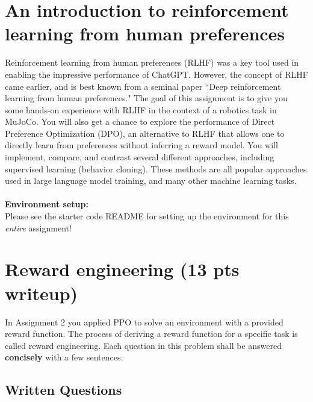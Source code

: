 \documentclass{article}
\begin{document}
\section*{An introduction to reinforcement learning from human preferences}

Reinforcement learning from human preferences (RLHF) was a key tool used in enabling the impressive performance of ChatGPT. However, the concept of RLHF came earlier, and is best known from a seminal paper ``Deep reinforcement learning from human preferences." The goal of this assignment is to give you some hands-on experience with RLHF in the context of a robotics task in MuJoCo. You will also get a chance to explore the performance of Direct Preference Optimization (DPO), an alternative to RLHF that allows one to directly learn from preferences without inferring a reward model.  
You will implement, compare, and contrast several different approaches, including supervised learning (behavior cloning). These methods are all popular approaches used in large language model training, and many other machine learning tasks.
\\
\\
\textbf{Environment setup:}\\
Please see the starter code README for setting up the environment for this \textit{entire} assignment!

\section{Reward engineering (13 pts writeup)}

In Assignment 2 you applied PPO to solve an environment with a provided reward function. The process of deriving a reward function for a specific task is called reward engineering. Each question in this problem shall be answered \textbf{concisely} with a few sentences.

\subsection{Written Questions}
\end{document}
